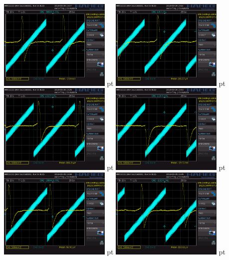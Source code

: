 \documentclass[12pt]{article}
\begin{document}
\begin{minipage}[h!]{\textwidth}
	\centering
	\includegraphics[width=0.4\textwidth]{data/HHH06.PNG} pt
	\includegraphics[width=0.4\textwidth]{data/HHH07.PNG} pt
	\includegraphics[width=0.4\textwidth]{data/HHH08.PNG} pt
	\includegraphics[width=0.4\textwidth]{data/HHH09.PNG} pt
	\includegraphics[width=0.4\textwidth]{data/HHH10.PNG} pt
	\includegraphics[width=0.4\textwidth]{data/HHH11.PNG} pt
\end{minipage}
\end{document}
